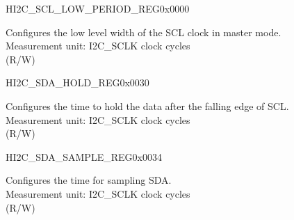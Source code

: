 \begin{register}{H}{I2C\_SCL\_LOW\_PERIOD\_REG}{0x0000}\label{regdesc:I2CSCLLOWPERIODREG}
    \regnewline%
    \begin{regdesc}\begin{reglist}
    \label{fielddesc:I2CSCLLOWPERIOD}\item [I2C\_SCL\_LOW\_PERIOD] Configures the low level width of the SCL clock in master mode. \\
    Measurement unit: I2C\_SCLK clock cycles \\ (R/W)
    \end{reglist}\end{regdesc}
    \end{register}


    \begin{register}{H}{I2C\_SDA\_HOLD\_REG}{0x0030}\label{regdesc:I2CSDAHOLDREG}
    \regnewline%
    \begin{regdesc}\begin{reglist}
    \label{fielddesc:I2CSDAHOLDTIME}\item [I2C\_SDA\_HOLD\_TIME] Configures the time to hold the data after the falling edge of SCL.\\
    Measurement unit: I2C\_SCLK clock cycles \\ (R/W)
    \end{reglist}\end{regdesc}
    \end{register}


    \begin{register}{H}{I2C\_SDA\_SAMPLE\_REG}{0x0034}\label{regdesc:I2CSDASAMPLEREG}
    \regnewline%
    \begin{regdesc}\begin{reglist}
    \label{fielddesc:I2CSDASAMPLETIME}\item [I2C\_SDA\_SAMPLE\_TIME] Configures the time for sampling SDA.\\
    Measurement unit: I2C\_SCLK clock cycles \\ (R/W)
    \end{reglist}\end{regdesc}
    \end{register}


